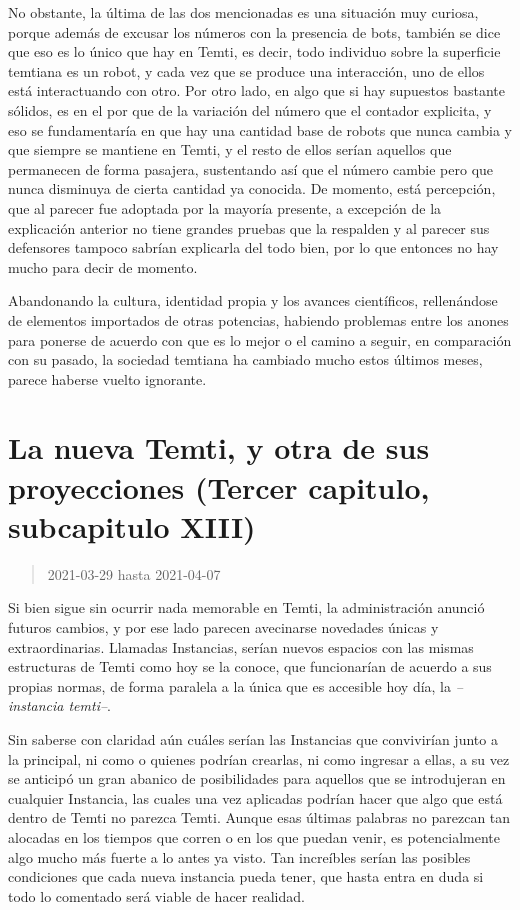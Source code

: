 \documentclass[
  spanish,
]{book}
\begin{document}
No obstante, la última de las dos mencionadas es una situación muy curiosa, porque además de excusar los números con la presencia de bots, también se dice que eso es lo único que hay en Temti, es decir, todo individuo sobre la superficie temtiana es un robot, y cada vez que se produce una interacción, uno de ellos está interactuando con otro. Por otro lado, en algo que si hay supuestos bastante sólidos, es en el por que de la variación del número que el contador explicita, y eso se fundamentaría en que hay una cantidad base de robots que nunca cambia y que siempre se mantiene en Temti, y el resto de ellos serían aquellos que permanecen de forma pasajera, sustentando así que el número cambie pero que nunca disminuya de cierta cantidad ya conocida.
De momento, está percepción, que al parecer fue adoptada por la mayoría presente, a excepción de la explicación anterior no tiene grandes pruebas que la respalden y al parecer sus defensores tampoco sabrían explicarla del todo bien, por lo que entonces no hay mucho para decir de momento.

Abandonando la cultura, identidad propia y los avances científicos, rellenándose de elementos importados de otras potencias, habiendo problemas entre los anones para ponerse de acuerdo con que es lo mejor o el camino a seguir, en comparación con su pasado, la sociedad temtiana ha cambiado mucho estos últimos meses, parece haberse vuelto ignorante.

\hypertarget{la-nueva-temti-y-otra-de-sus-proyecciones-tercer-capitulo-subcapitulo-xiii}{%
\section{La nueva Temti, y otra de sus proyecciones (Tercer capitulo, subcapitulo XIII)}\label{la-nueva-temti-y-otra-de-sus-proyecciones-tercer-capitulo-subcapitulo-xiii}}

\begin{quote}
2021-03-29 hasta 2021-04-07
\end{quote}

Si bien sigue sin ocurrir nada memorable en Temti, la administración anunció futuros cambios, y por ese lado parecen avecinarse novedades únicas y extraordinarias. Llamadas Instancias, serían nuevos espacios con las mismas estructuras de Temti como hoy se la conoce, que funcionarían de acuerdo a sus propias normas, de forma paralela a la única que es accesible hoy día, la \emph{--instancia temti--}.

Sin saberse con claridad aún cuáles serían las Instancias que convivirían junto a la principal, ni como o quienes podrían crearlas, ni como ingresar a ellas, a su vez se anticipó un gran abanico de posibilidades para aquellos que se introdujeran en cualquier Instancia, las cuales una vez aplicadas podrían hacer que algo que está dentro de Temti no parezca Temti. Aunque esas últimas palabras no parezcan tan alocadas en los tiempos que corren o en los que puedan venir, es potencialmente algo mucho más fuerte a lo antes ya visto. Tan increíbles serían las posibles condiciones que cada nueva instancia pueda tener, que hasta entra en duda si todo lo comentado será viable de hacer realidad.
\end{document}
